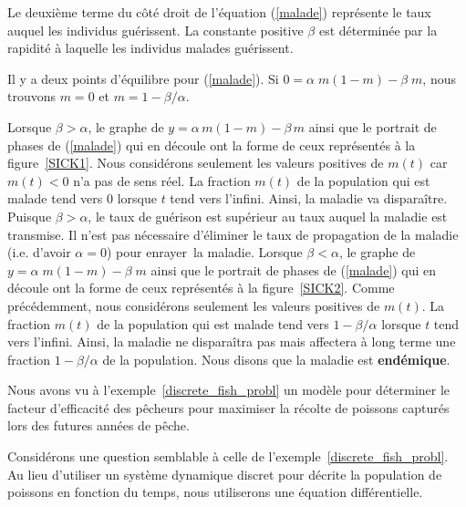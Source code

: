 {\begin{egg}[\life]
Le deuxième terme du côté droit de l'équation (\ref{malade})
représente le taux auquel les individus guérissent.  La constante
positive $\beta$ est déterminée par la rapidité à laquelle les
individus malades guérissent.

Il y a deux points d'équilibre pour (\ref{malade}).  Si
$0 = \alpha \; m (1-m) - \beta \; m$, nous trouvons $m = 0$ et
$m = 1 - \beta/\alpha$.

Lorsque $\beta>\alpha$, le graphe de
$y = \alpha \, m (1-m) - \beta \,m$
ainsi que le portrait de phases de (\ref{malade}) qui en découle ont la
forme de ceux représentés à la figure~\ref{SICK1}.  Nous considérons
seulement les valeurs positives de $m(t)$ car $m(t)<0$ n'a pas de sens
réel.  La fraction $m(t)$ de la population qui est malade tend vers
$0$ lorsque $t$ tend vers l'infini.  Ainsi, la maladie va disparaître.
Puisque $\beta > \alpha$, le taux de guérison est supérieur au taux
auquel la maladie est transmise. Il n'est pas nécessaire d'éliminer le
taux de propagation de la maladie (i.e. d'avoir $\alpha=0$) pour
\lgm enrayer\rgm\ la maladie.  Lorsque $\beta<\alpha$,  le graphe de
$y = \alpha \; m (1-m) - \beta \; m$ ainsi que le portrait de phases de
(\ref{malade}) qui en découle ont la forme de ceux représentés à la
figure~\ref{SICK2}.  Comme précédemment, nous considérons seulement les
valeurs positives de $m(t)$.  La fraction $m(t)$ de la population qui
est malade tend vers $1-\beta/\alpha$ lorsque $t$ tend vers l'infini.
Ainsi, la maladie ne disparaîtra pas mais affectera à long terme une
fraction $1-\beta/\alpha$ de la population.  Nous disons que la maladie est
{\bfseries endémique}.
\end{egg}



\begin{egg}[\life]
Nous avons vu à l'exemple~\ref{discrete_fish_probl} un modèle pour déterminer
le facteur d'efficacité des pêcheurs pour maximiser la récolte de
poissons capturés lors des futures années de pêche.

Considérons une question semblable à celle de
l'exemple~\ref{discrete_fish_probl}.  Au lieu d'utiliser un système
dynamique discret pour décrite la population de poissons en fonction
du temps, nous utiliserons une équation différentielle.


\end{egg}}
